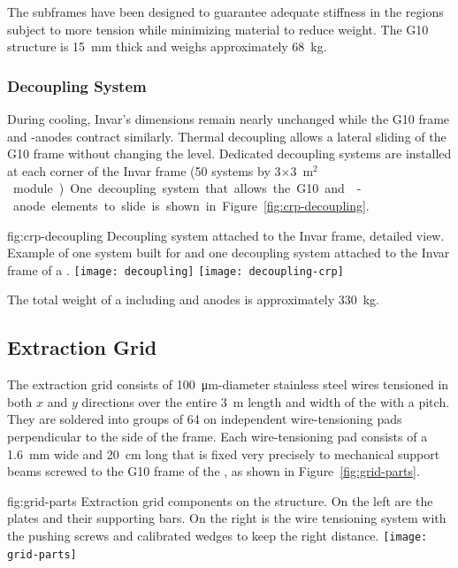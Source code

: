 The subframes have been designed to guarantee  
adequate stiffness in the  regions subject to more tension while minimizing material to reduce weight.
The G10 structure is \SI{15}{mm} thick and weighs approximately \SI{68}{kg}. 

\subsubsection{Decoupling System}
 
During cooling, Invar's dimensions remain nearly unchanged while the G10 frame and -anodes contract similarly. Thermal decoupling allows a lateral sliding of the G10 frame without changing the level. 
Dedicated decoupling systems are installed at each corner of the Invar frame (\num{50} systems by  \num{3}$\times$\SI{3}{m$^{2}$} module). One decoupling system that allows the G10 and -anode elements to slide is shown in  Figure~\ref{fig:crp-decoupling}.

\begin{dunefigure}{fig:crp-decoupling}
{Decoupling system attached to the Invar frame, detailed view. Example of one system built for  and one decoupling system attached to the Invar frame of a .}
\texttt{[image: decoupling]}
\texttt{[image: decoupling-crp]}
\end{dunefigure}

The total weight of a  including  and anodes is approximately \SI{330}{kg}.

\subsection{Extraction Grid}
\label{sec:fddp-crp-grid}
The extraction grid consists of \SI{100}{\micro\meter}-diameter stainless steel wires tensioned in both $x$ and $y$ directions over the entire \SI{3}{m} length and width of the  with a \dpstrippitch pitch. They are soldered into groups of \num{64} on independent wire-tensioning pads perpendicular to the side of the  frame. Each wire-tensioning pad consists of a  \SI{1.6}{mm} wide and \SI{20}{cm} long that is fixed very precisely to mechanical support beams screwed to the G10 frame of the , as shown in Figure~\ref{fig:grid-parts}.
\begin{dunefigure}{fig:grid-parts}
{Extraction grid components on the  structure. On the left are the  plates and their supporting bars. On the right is the  
wire tensioning system with the pushing screws and calibrated wedges to keep the right distance.}
\texttt{[image: grid-parts]}
\end{dunefigure}

